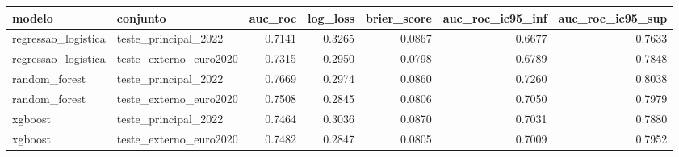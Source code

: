\begin{tabular}{llrrrrr}
\toprule
modelo & conjunto & auc_roc & log_loss & brier_score & auc_roc_ic95_inf & auc_roc_ic95_sup \\
\midrule
regressao_logistica & teste_principal_2022 & 0.7141 & 0.3265 & 0.0867 & 0.6677 & 0.7633 \\
regressao_logistica & teste_externo_euro2020 & 0.7315 & 0.2950 & 0.0798 & 0.6789 & 0.7848 \\
random_forest & teste_principal_2022 & 0.7669 & 0.2974 & 0.0860 & 0.7260 & 0.8038 \\
random_forest & teste_externo_euro2020 & 0.7508 & 0.2845 & 0.0806 & 0.7050 & 0.7979 \\
xgboost & teste_principal_2022 & 0.7464 & 0.3036 & 0.0870 & 0.7031 & 0.7880 \\
xgboost & teste_externo_euro2020 & 0.7482 & 0.2847 & 0.0805 & 0.7009 & 0.7952 \\
\bottomrule
\end{tabular}
